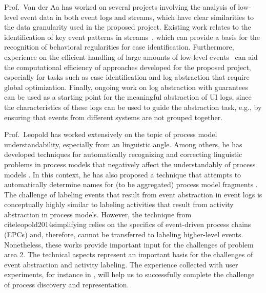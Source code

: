 Prof.\ Van der Aa has worked on several projects involving the analysis of low-level event data in both event logs and streams, which have clear similarities to the data granularity used in the proposed project.
Existing work relates to the identification of key event patterns in streams~\cite{vanderaa2021cep}, which can provide a basis for the recognition of behavioral regularities for case identification.
Furthermore, experience on the efficient handling of large amounts of low-level events~\cite{zhao2021eires} can aid the computational efficiency of approaches developed for the proposed project, especially for tasks such as case identification and log abstraction that require global optimization.
Finally, ongoing work on log abstraction with guarantees~\cite{rebmann2021icdesubm} can be used as a starting point for the meaningful abstraction of UI logs, since the characteristics of these logs can be used to guide the abstraction task, e.g., by ensuring that events from different systems are not grouped together.

Prof.\ Leopold has worked extensively on the topic of process model understandability, especially from an linguistic angle. Among others, he has developed techniques for automatically recognizing and correcting linguistic problems in process models that negatively affect the understandably of process models \cite{leopold2013detection,leopold2012refactoring,pittke2015automatic}. In this context, he has also proposed a technique that attempts to automatically determine names for (to be aggregated) process model fragments \cite{leopold2014simplifying}.  The challenge of labeling events that result from event abstraction in event logs is conceptually highly similar to labeling activities that result from activity abstraction in process models. However, the technique from cite{leopold2014simplifying} relies on the specifics of event-driven process chains (EPCs) and, therefore, cannot be transferred to labeling higher-level events. Nonetheless, these works provide important input for the challenges of problem area 2. The technical aspects represent an important basis for the challenges of event abstraction and activity labeling. The experience collected with user experiments, for instance in \cite{pittke2015automatic}, will help us to successfully complete the challenge of process discovery and representation. 


